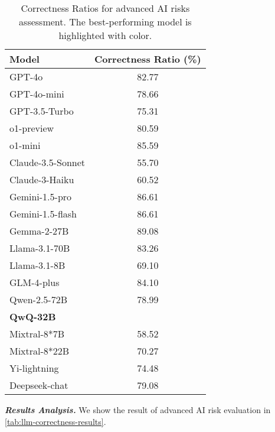  \begin{wraptable}{r}{0.55\textwidth}
    \centering
        \centering
        \small
        \renewcommand\arraystretch{1.3}
        \setlength{\tabcolsep}{3pt}
        \caption{Correctness Ratios for advanced AI risks assessment. The best-performing model is highlighted with {} color.}
        \begin{tabular}{lc}
            \toprule[1pt]
            \textbf{Model}    & \textbf{Correctness Ratio (\%)} \\ \midrule
            GPT-4o            & 82.77 \\
            GPT-4o-mini       & 78.66 \\
            GPT-3.5-Turbo     & 75.31 \\
             o1-preview     & 80.59\\
             o1-mini     &  85.59 \\
            Claude-3.5-Sonnet & 55.70 \\
            Claude-3-Haiku    & 60.52 \\
            Gemini-1.5-pro    & 86.61 \\
            Gemini-1.5-flash  & 86.61 \\
            Gemma-2-27B       & 89.08 \\
            Llama-3.1-70B     & 83.26 \\
            Llama-3.1-8B      & 69.10 \\
            GLM-4-plus        & 84.10 \\
            Qwen-2.5-72B      & 78.99 \\
            \textbf{QwQ-32B} & \textbf{\underline{\color{OliveGreen}{90.59}}} \\
            Mixtral-8*7B      & 58.52 \\
            Mixtral-8*22B     & 70.27 \\
            Yi-lightning      & 74.48 \\
            Deepseek-chat     & 79.08 \\ 
            \bottomrule[1pt]
        \end{tabular}
        \label{tab:llm-correctness-results}
        \vspace{-15pt}
\end{wraptable}


\textbf{\textit{Results Analysis.}} We show the result of advanced AI risk evaluation in \autoref{tab:llm-correctness-results}.
        
